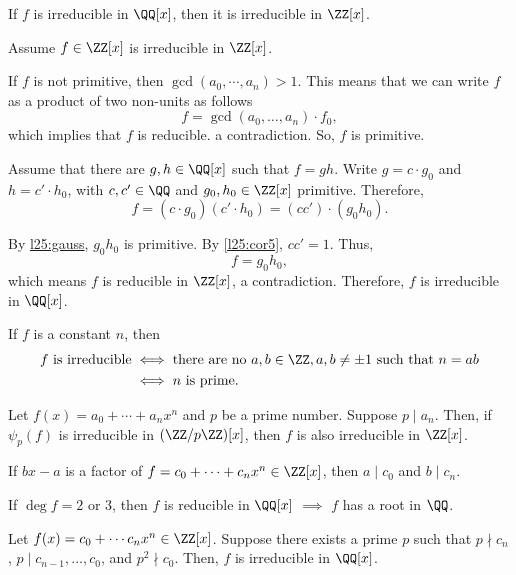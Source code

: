 \begin{dem}[of $i$]
	If $f$ is irreducible in $\QQ[x]$, then it is irreducible in $\ZZ[x]$.

	Assume $f \in \ZZ[x]$ is irreducible in $\ZZ[x]$.

	If $f$ is not primitive, then $\gcd(a_0, \cdots, a_n) > 1$. This means that we can write $f$ as a product of two non-units as follows \[f = \gcd(a_0, \dots, a_n) \cdot f_0,\] which implies that $f $ is reducible. a contradiction. So, $f$ is primitive.

	Assume that  there are $g, h \in \QQ[x]$ such that $f = gh$. Write $g = c\cdot g_0$ and $h = c'\cdot h_0$, with $c, c' \in \QQ$ and $g_0, h_0 \in \ZZ[x]$ primitive. Therefore, \[f = (c\cdot g_0) (c' \cdot h_0) = (cc')\cdot(g_0h_0).\]

	By \hyperref[Gauss' Lemma]{l25:gauss},  $g_0h_0$ is primitive. By \cref{l25:cor5}, $cc' = 1$. Thus, \[f = g_0h_0, \] which means $f$ is reducible in $\ZZ[x]$, a contradiction. Therefore, $f$ is irreducible in $\QQ[x]$.
\end{dem}

\begin{dem}[of $ii$]
	If $f$ is a constant $n$, then
	 \begin{align*}
		 \text{$f$ is irreducible} & \iff \text{there are no $a, b \in \ZZ, a, b \neq \pm 1$ such that $n = ab$} \\
		 & \iff \text{$n$ is prime.}
	\end{align*}
\end{dem}

\begin{prop}
	Let $f(x) = a_0 + \cdots + a_nx^n$ and $p$ be a prime number. Suppose $p \mid a_n$. Then, if  $\psi_p(f)$ is irreducible in $(\ZZ/p\ZZ)[x]$, then $f$ is also irreducible in $\ZZ[x]$.
\end{prop}

\begin{prop}
	If $bx - a$ is a factor of $f = c_0 + \cdots + c_nx^n \in \ZZ[x]$, then $a \mid c_0$ and $b \mid c_n$.
\end{prop}

\begin{prop}
	If $\deg f = 2$ or $3$, then $f$ is reducible in $\QQ[x]$ $\implies$ $f$ has a root in $\QQ$.
\end{prop}

\begin{prop}\label{l26:eisenstein}
	Let $f(x) = c_0 + \cdots c_nx^n \in \ZZ[x]$.
	Suppose there exists a prime $p$ such that $p \nmid c_n$, $p \mid c_{n-1}, \dots, c_0$, and  $p^2 \nmid c_0$.
	Then, $f$ is irreducible in $\QQ[x]$.
\end{prop}
